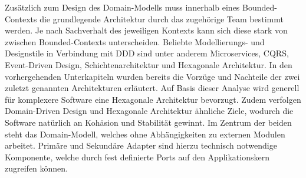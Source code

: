 
Zusätzlich zum Design des Domain-Modells muss innerhalb eines Bounded-Contexts die grundlegende Architektur durch das zugehörige Team bestimmt werden. Je nach Sachverhalt des jeweiligen Kontexts kann sich diese stark von zwischen Bounded-Contexts unterscheiden. Beliebte Modellierungs- und Designstile in Verbindung mit DDD sind unter anderem Microservices, CQRS, Event-Driven Design, Schichtenarchitektur und Hexagonale Architektur. In den vorhergehenden Unterkapiteln wurden bereits die Vorzüge und Nachteile der zwei zuletzt genannten Architekturen erläutert. Auf Basis dieser Analyse wird generell für komplexere Software eine Hexagonale Architektur bevorzugt. Zudem verfolgen Domain-Driven Design und Hexagonale Architektur ähnliche Ziele, wodurch die Software natürlich an Kohäsion und Stabilität gewinnt. Im Zentrum der beiden steht das Domain-Modell, welches ohne Abhängigkeiten zu externen Modulen arbeitet. Primäre und Sekundäre Adapter sind hierzu technisch notwendige Komponente, welche durch fest definierte Ports auf den Applikationskern zugreifen können. 




















































